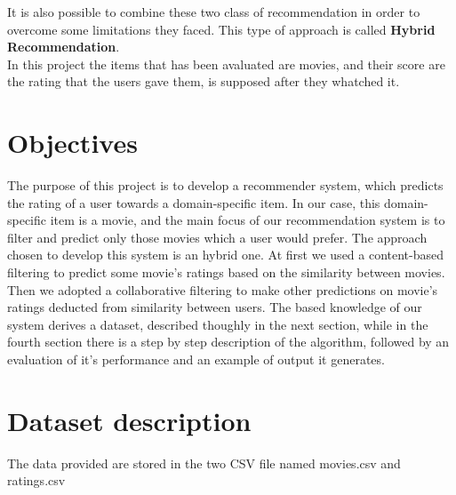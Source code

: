 \documentclass{article}
\begin{document}
It is also possible to combine these two class of recommendation in order to overcome some limitations they faced. This type of approach is called \textbf{Hybrid Recommendation}.\\
In this project the items that has been avaluated are movies, and their score are the rating that the users gave them, is supposed after they whatched it.

\newpage

\section{Objectives}

The purpose of this project is to develop a recommender system, which predicts the rating of a user towards a domain-specific item. In our case, this domain-specific item is a movie, and the main focus of our recommendation system is to filter and predict only those movies which a user would prefer. The approach chosen to develop this system is an hybrid one. At first we used a content-based filtering to predict some movie’s ratings based on the similarity between movies. Then we adopted a collaborative filtering to make other predictions on movie’s ratings deducted from similarity between users. The based knowledge of our system derives a dataset, described thoughly in the next section, while in the fourth section there is a step by step description of the algorithm, followed by an evaluation of it’s performance and an example of output it generates.

\newpage

\section{Dataset description}
The data provided are stored in the two CSV file named movies.csv and ratings.csv
\end{document}
